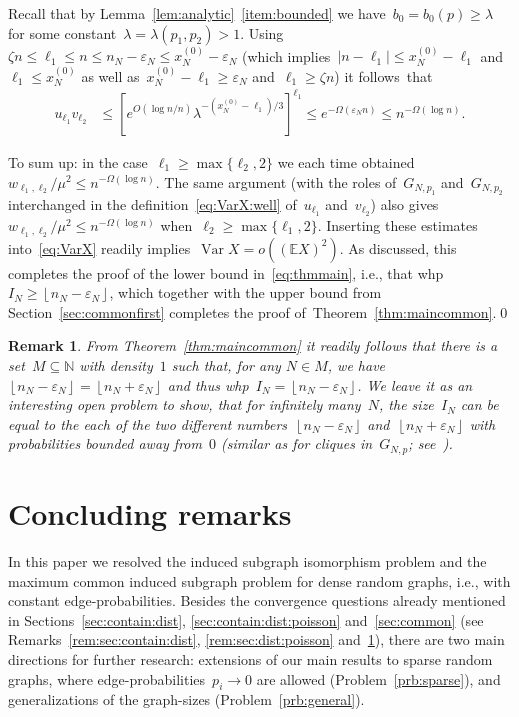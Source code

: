\documentclass{article}
\newcommand{\eps}{\varepsilon}
\newcommand{\bN}{\mathbb{N}}
\newcommand{\E}{\mathbb{E}}
\newcommand\floor[1]{\left\lfloor #1 \right \rfloor}
\newcommand{\nN}{n_N}
\newcommand\Var{\operatorname{Var}}
\renewcommand{\u}{u}
\renewcommand{\v}{v}
\newtheorem{remark}{Remark}
\newcommand\lrsqpar[1]{\left[#1\right]}
\newcommand\noproof{\qed}
\begin{document}
Recall that by Lemma~\ref{lem:analytic}~\ref{item:bounded} we have~$b_0=b_0(p)\ge \lambda$ for some constant~${\lambda=\lambda(p_1,p_2)>1}$.
Using~${\zeta n \le \ell_1 \le n} \le {n_N-\eps_N} \le {x^{(0)}_N-\eps_N}$ 
(which implies~$|n-\ell_1| \le x^{(0)}_N-\ell_1$ and~$\ell_1 \le x^{(0)}_N$ as well as~$x^{(0)}_N-\ell_1 \ge \eps_N$ and~$\ell_1 \ge \zeta n$) it follows~that 
\begin{equation}\label{eq:bound:uv:4}
\begin{split}
    \u_{\ell_1} \v_{\ell_2}&\le \lrsqpar{e^{O(\log n/n)} \lambda^{-(x^{(0)}_N-\ell_1)/3}}^{\ell_1} \le 
    e^{-\Omega(\eps_Nn)}
\le n^{-\Omega(\log n)}.
\end{split}
\end{equation}

To sum up: in the case~$\ell_1\ge \max\{\ell_2,2\}$ we each time obtained~$w_{\ell_1,\ell_2}/\mu^2 \le  n^{-\Omega(\log n)}$. The same argument (with the roles of~$G_{N,p_1}$ and~$G_{N,p_2}$ interchanged in the definition~\eqref{eq:VarX:well} of~$u_{\ell_1}$ and~$v_{\ell_2}$) also gives~$w_{\ell_1,\ell_2}/\mu^2 \le  n^{-\Omega(\log n)}$ when~$\ell_2\ge \max\{\ell_1,2\}$. 
Inserting these estimates into~\eqref{eq:VarX} readily implies~$\Var X = o((\E X)^2)$.
As discussed, this completes the proof of the lower bound in~\eqref{eq:thmmain}, i.e., that whp~$I_N \ge  \floor{\nN-\eps_N}$, 
which together with the upper bound from  Section~\ref{sec:commonfirst} 
completes the proof of~Theorem~\ref{thm:maincommon}.\noproof


\begin{remark}\label{rem:sec:common}
From Theorem~\ref{thm:maincommon} it readily follows that there is a set~$M\subseteq \bN$ with density~$1$ such that, for any $N\in M$, we have~$\floor{n_N-\eps_N}=\floor{n_N+\eps_N}$ and thus whp~$I_N =\floor{n_N-\eps_N}$. 
We leave it as an interesting open problem to show, that for infinitely many~$N$, the size~$I_N$ can be equal to the each of the two different numbers~$\floor{n_N-\eps_N}$ and~$\floor{n_N+\eps_N}$ with probabilities bounded away from~$0$ (similar as for cliques in~$G_{N,p}$; see~\cite[Theorem~11.7]{BB}). 
\end{remark}





\section{Concluding remarks}\label{sec:final}
In this paper we resolved the induced subgraph isomorphism problem and the maximum common induced subgraph problem for dense random graphs, i.e., with constant edge-probabilities. 
Besides the convergence questions already mentioned in Sections~\ref{sec:contain:dist}, \ref{sec:contain:dist:poisson} and~\ref{sec:common} (see Remarks~\ref{rem:sec:contain:dist}, \ref{rem:sec:dist:poisson} and~\ref{rem:sec:common}),  
there are two main directions for further research: \linebreak[3]
extensions of our main results to sparse random graphs, where edge-probabilities~$p_i \to 0$ are allowed \mbox{(Problem~\ref{prb:sparse})}, 
and generalizations of the graph-sizes \mbox{(Problem~\ref{prb:general})}.   
\end{document}

